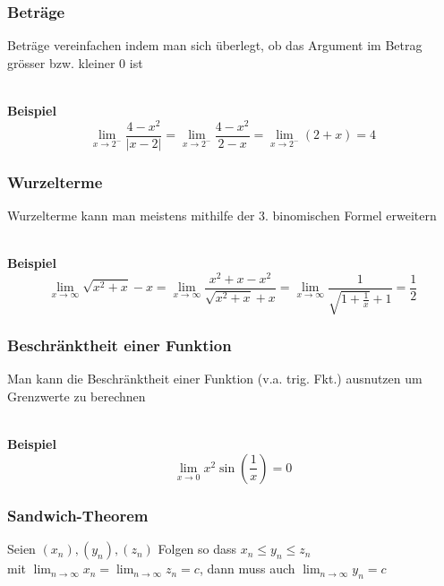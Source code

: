 \documentclass[a4paper, fontsize = 8pt, landscape]{scrartcl}
\newenvironment {example}
				{\begin{itshape} \begin{small}}
				{\end{small} \end{itshape}}
\begin{document}
\begin{multicols*}{3}
    \subsubsection{Beträge}
    Beträge vereinfachen indem man sich überlegt, ob das Argument im Betrag grösser bzw. kleiner 0 ist\\\\
    \begin{example}
        \textbf{Beispiel}
        \begin{equation*}
            \lim_{x \rightarrow 2^-} \frac{4-x^2}{\vert x-2 \vert} = \lim_{x \rightarrow 2^-} \frac{4-x^2}{2-x} = \lim_{x \rightarrow 2^-} (2+x) = 4
        \end{equation*}
    \end{example}
    \subsubsection{Wurzelterme}
    Wurzelterme kann man meistens mithilfe der 3. binomischen Formel erweitern\\\\
    \begin{example}
        \textbf{Beispiel}
        \begin{equation*}
            \lim_{x \rightarrow \infty} \sqrt{x^2+x}-x = \lim_{x \rightarrow \infty} \frac{x^2+x-x^2}{\sqrt{x^2+x}+x} = \lim_{x \rightarrow \infty} \frac{1}{\sqrt{1+\frac{1}{x}}+1}=\frac{1}{2}
        \end{equation*}
    \end{example}
    \subsubsection{Beschränktheit einer Funktion}
    Man kann die Beschränktheit einer Funktion (v.a. trig. Fkt.) ausnutzen um Grenzwerte zu berechnen\\\\
    \begin{example}
        \textbf{Beispiel}
        \begin{equation*}
            \lim_{x \rightarrow 0} x^2 \sin \left(\frac{1}{x} \right) = 0
        \end{equation*}
    \end{example}
    \subsubsection{Sandwich-Theorem}
    Seien $(x_n),(y_n),(z_n)$ Folgen so dass $x_n\le y_n\le z_n$\\ mit $\lim_{n \rightarrow \infty} x_n= \lim_{n \rightarrow \infty} z_n=c$, dann muss auch $\lim_{n \rightarrow \infty} y_n=c $

\end{multicols*}
\end{document}
